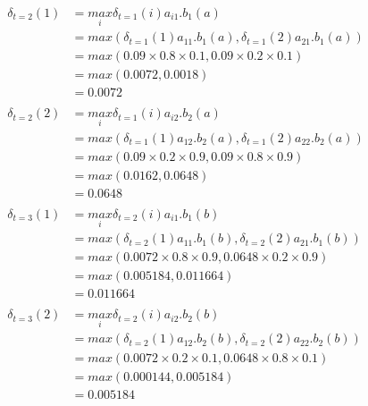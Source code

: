 \documentclass[12pt]{article}
\begin{document}
\begin{equation}
	\begin{aligned}
		\delta_{t=2}(1) &= \underset{i}{max} \delta_{t=1}(i)a_{i1}.b_1(a) \\
		&= max(\delta_{t=1}(1)a_{11}.b_1(a), \delta_{t=1}(2)a_{21}.b_1(a)) \\
		&= max(0.09 \times 0.8 \times 0.1, 0.09 \times 0.2 \times 0.1) \\
		&= max(0.0072, 0.0018) \\
		&= 0.0072 \\ \\
		\delta_{t=2}(2) &= \underset{i}{max} \delta_{t=1}(i)a_{i2}.b_2(a) \\
		&= max(\delta_{t=1}(1)a_{12}.b_2(a), \delta_{t=1}(2)a_{22}.b_2(a)) \\
		&= max(0.09 \times 0.2 \times 0.9, 0.09 \times 0.8 \times 0.9) \\
		&= max(0.0162, 0.0648) \\
		&= 0.0648 \\ \\
		\delta_{t=3}(1) &= \underset{i}{max} \delta_{t=2}(i)a_{i1}.b_1(b) \\
		&= max(\delta_{t=2}(1)a_{11}.b_1(b), \delta_{t=2}(2)a_{21}.b_1(b)) \\
		&= max(0.0072 \times 0.8 \times 0.9, 0.0648 \times 0.2 \times 0.9) \\
		&= max(0.005184, 0.011664) \\
		&= 0.011664 \\ \\
		\delta_{t=3}(2) &= \underset{i}{max} \delta_{t=2}(i)a_{i2}.b_2(b) \\
		&= max(\delta_{t=2}(1)a_{12}.b_2(b), \delta_{t=2}(2)a_{22}.b_2(b)) \\
		&= max(0.0072 \times 0.2 \times 0.1, 0.0648 \times 0.8 \times 0.1) \\
		&= max(0.000144, 0.005184) \\
		&= 0.005184 \\ \\
	\end{aligned}
\end{equation}
\end{document}

